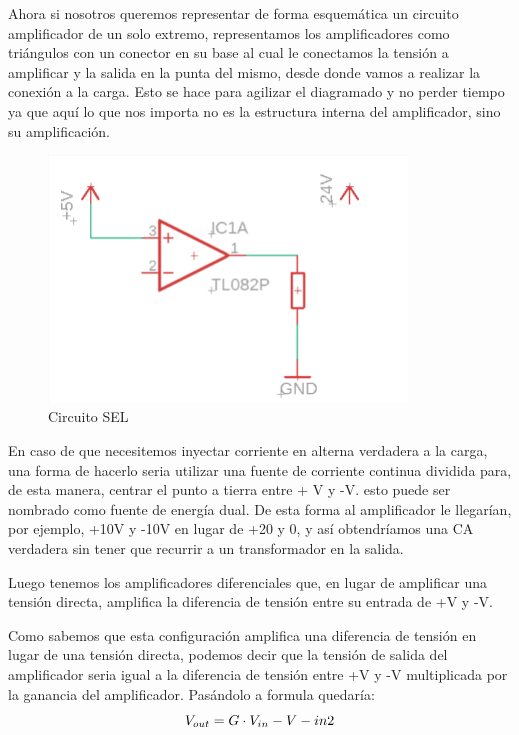 \documentclass[../main.tex]{subfiles}
\begin{document}
	Ahora si nosotros queremos representar de forma esquemática un circuito 
	amplificador de un solo extremo, representamos los amplificadores como triángulos 
	con un conector en su base al cual le conectamos la tensión a amplificar y la 
	salida en la punta del mismo, desde donde vamos a realizar la conexión a la carga. 
	Esto se hace para agilizar el diagramado y no perder tiempo ya que aquí lo que nos 
	importa no es la estructura interna del amplificador, sino su amplificación.

	\begin{figure}[H]
		\includegraphics[width=0.85\textwidth]{imagen16.png}
		\centering
		\caption{Circuito SEL}
	\end{figure}

	En caso de que necesitemos inyectar corriente en alterna verdadera a la carga, una 
	forma de hacerlo seria utilizar una fuente de corriente continua dividida para, de 
	esta manera, centrar el punto a tierra entre + V y -V. esto puede ser nombrado 
	como fuente de energía dual. De esta forma al amplificador le llegarían, por 
	ejemplo, +10V y -10V en lugar de +20 y 0, y así  obtendríamos una CA verdadera sin 
	tener que recurrir a un transformador en la salida.

	Luego tenemos los amplificadores diferenciales que, en lugar de amplificar una 
	tensión directa, amplifica la diferencia de tensión entre su entrada de +V y -V.

	Como sabemos que esta configuración amplifica una diferencia de tensión en lugar 
	de una tensión directa, podemos decir que la tensión de salida del amplificador 
	seria igual a la diferencia de tensión entre +V y -V multiplicada por la ganancia 
	del amplificador. Pasándolo a formula quedaría:
	\[
		V_{out} = G \cdot V_{in} - V-{in2}
	\]
\end{document}
